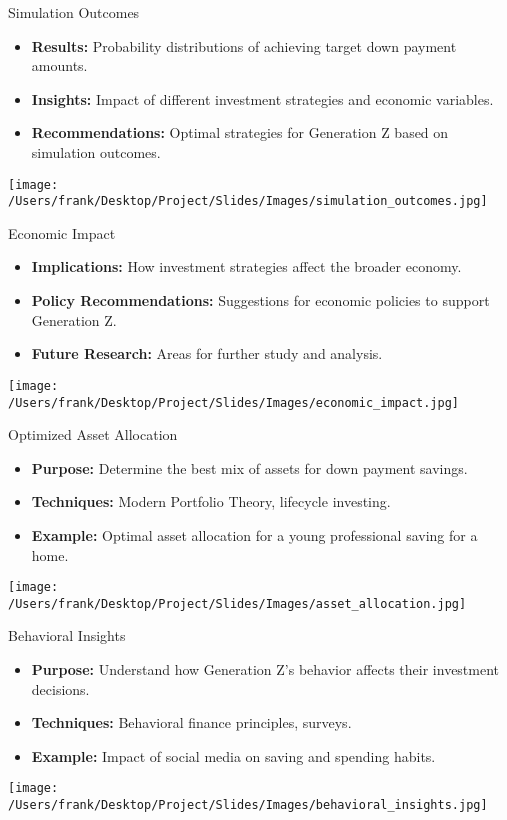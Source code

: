 \documentclass{beamer}
\begin{document}
\begin{frame}{Simulation Outcomes}
    \begin{itemize}
        \item \textbf{Results:} Probability distributions of achieving target down payment amounts.
        \item \textbf{Insights:} Impact of different investment strategies and economic variables.
        \item \textbf{Recommendations:} Optimal strategies for Generation Z based on simulation outcomes.
    \end{itemize}
    \centering
    \texttt{[image: /Users/frank/Desktop/Project/Slides/Images/simulation\_outcomes.jpg]}
\end{frame}

\begin{frame}{Economic Impact}
    \begin{itemize}
        \item \textbf{Implications:} How investment strategies affect the broader economy.
        \item \textbf{Policy Recommendations:} Suggestions for economic policies to support Generation Z.
        \item \textbf{Future Research:} Areas for further study and analysis.
    \end{itemize}
    \centering
    \texttt{[image: /Users/frank/Desktop/Project/Slides/Images/economic\_impact.jpg]}
\end{frame}

\begin{frame}{Optimized Asset Allocation}
    \begin{itemize}
        \item \textbf{Purpose:} Determine the best mix of assets for down payment savings.
        \item \textbf{Techniques:} Modern Portfolio Theory, lifecycle investing.
        \item \textbf{Example:} Optimal asset allocation for a young professional saving for a home.
    \end{itemize}
    \centering
    \texttt{[image: /Users/frank/Desktop/Project/Slides/Images/asset\_allocation.jpg]}
\end{frame}

\begin{frame}{Behavioral Insights}
    \begin{itemize}
        \item \textbf{Purpose:} Understand how Generation Z’s behavior affects their investment decisions.
        \item \textbf{Techniques:} Behavioral finance principles, surveys.
        \item \textbf{Example:} Impact of social media on saving and spending habits.
    \end{itemize}
    \centering
    \texttt{[image: /Users/frank/Desktop/Project/Slides/Images/behavioral\_insights.jpg]}
\end{frame}
\end{document}
